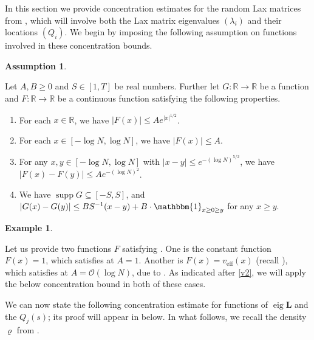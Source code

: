 \documentclass{amsart}
\numberwithin{equation}{section}
\DeclareMathOperator{\eig}{eig}
\DeclareMathOperator{\eff}{eff}
\DeclareMathOperator{\supp}{supp}
\theoremstyle{remark}
\theoremstyle{definition}
\newtheorem{example}[thm]{Example}
\newtheorem{assumption}[thm]{Assumption}
\begin{document}
	In this section we provide concentration estimates for the random Lax matrices from , which will involve both the Lax matrix eigenvalues $(\lambda_i)$ and their locations $(Q_i)$. We begin by imposing the following assumption on functions involved in these concentration bounds. 
	
	\begin{assumption}

	\label{fgab} 
	
	Let $A, B \ge 0$ and $S \in [1, T]$ be real numbers. Further let $G : \mathbb{R} \rightarrow \mathbb{R}$ be a function and $F: \mathbb{R} \rightarrow \mathbb{R}$ be a continuous function satisfying the following properties.
	
	\begin{enumerate} 
		
		\item For each $x \in \mathbb{R}$, we have  $| F(x) | \le A e^{|x|^{1/2}}$.
		\item For each $x \in [-\log N, \log N]$, we have $| F(x) | \le A$. 
		\item For any $x, y \in [-\log N, \log N]$ with $|x-y| \le e^{-(\log N)^{5/2}}$, we have $| F(x) - F(y) | \le A e^{-(\log N)^2}$.
		\item We have $\supp G \subseteq [-S, S]$, and $| G (x) - G(y) |\le BS^{-1} (x-y) + B \cdot \mathbbm{1}_{x \ge 0 \ge y}$ for any $x \ge y$.
		
	\end{enumerate} 
	
	\end{assumption} 

	\begin{example} 
		
		\label{examplef} 
		
		Let us provide two functions $F$ satisfying . One is the constant function $F(x) = 1$, which satisfies  at $A=1$. Another is $F(x) = v_{\eff} (x)$ (recall ), which satisfies  at $A = \mathcal{O}(\log N)$, due to . As indicated after \eqref{v2}, we will apply the below concentration bound  in both of these cases.
	
	\end{example} 
	
	We can now state the following concentration estimate for functions of $\eig \bm{L}$ and the $Q_j (s)$; its proof will appear in  below. In what follows, we recall the density $\varrho$ from .
\end{document}
